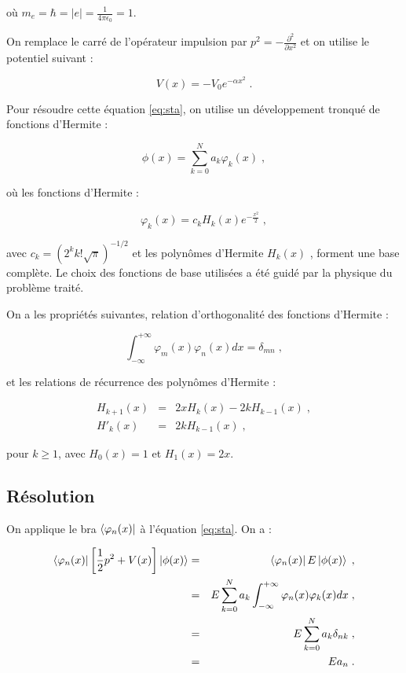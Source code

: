 \documentclass{report}
\begin{document}
où $m_{e}=\hbar=\left|e\right|=\frac{1}{4\pi\epsilon_{0}}=1$.

On remplace le carré de l'opérateur impulsion par $p^{2}=-\frac{\partial^2}{\partial x^{2}}$ et on utilise le potentiel suivant :

\begin{equation}
V(x)= -V_{0}e^{-\alpha x^{2}}\;.
\end{equation}

Pour résoudre cette équation \eqref{eq:sta}, on utilise un développement tronqué de fonctions d'Hermite :

\begin{equation}\label{eq:varphi}
\phi(x)= \sum_{k=0}^N a_k \varphi_k(x)\;,
\end{equation}

où les fonctions d'Hermite :

\begin{equation}
\varphi_k(x)= c_{k} H_{k}(x)e^{-\frac{x^{2}}{2}}\;,
\end{equation}

avec $c_{k} =\left(2^{k}k!\sqrt{\pi}\right)^{-1/2}$ et les polynômes d'Hermite $H_{k}(x)$ , forment une base complète. Le choix des fonctions de base utilisées a été guidé par la physique du problème traité.

On a les propriétés suivantes, relation d'orthogonalité des fonctions d'Hermite :

\begin{equation}\label{eq:ortho_phi}
\int_{-\infty}^{+\infty} \varphi_m(x) \varphi_n(x) dx = \delta_{mn}\;,
\end{equation}

et les relations de récurrence des polynômes d'Hermite :

\begin{eqnarray}\label{eq:recu}
H_{k+1}(x) &=& 2xH_k(x) - 2kH_{k-1}(x) \;,\\
H'_{k}(x) &=& 2k H_{k-1}(x)\;,\label{eq:recu2}
\end{eqnarray}

pour $k \geq 1$, avec $H_0 (x) = 1$ et $H_1 (x) = 2x$.

\subsection{Résolution}

On applique le bra $\bra{\varphi_n(x)}$ à l'équation \eqref{eq:sta}. On a :

\begin{eqnarray}
\bra{\varphi_n(x)}\left[\frac{1}{2}p^{2}+V(x)\right]\ket{\phi(x)} &=& \bra{\varphi_n(x)}E\ket{\phi(x)}\;,\\
 &=& E \sum_{k=0}^N a_k \int_{-\infty}^{+\infty} \varphi_n(x)\varphi_k(x) dx\;,\\
&=& E \sum_{k=0}^N a_k \delta_{nk}\;,\\
&=& E a_n\;.
\end{eqnarray} 
\end{document}
